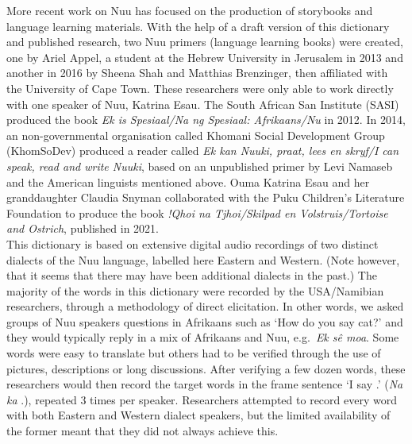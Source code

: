 More recent work on N\textipa{\textvertline}uu has focused on the
production of storybooks and language learning materials. With the
help of a draft version of this dictionary and published research, two
N\textipa{\textvertline}uu primers (language learning books) were
created, one by Ariel Appel, a student at the Hebrew University in
Jerusalem in 2013 and another in 2016 by Sheena Shah and Matthias
Brenzinger, then affiliated with the University of Cape Town. These
researchers were only able to work directly with one speaker of
N\textipa{\textvertline}uu, Katrina Esau. The South African San
Institute (SASI) produced the book \emph{Ek is Spesiaal/Na ng
Spesiaal: Afrikaans/N\textipa{\textvertline}u} in 2012. In 2014, an
non-governmental organisation called
\textipa{\textdoublebarpipe}Khomani Social Development Group
(KhomSoDev) produced a reader called \emph{Ek kan
N\textipa{\textvertline}uuki, praat, lees en skryf/I can speak, read
and write N\textipa{\textvertline}uuki}, based on an unpublished
primer by Levi Namaseb and the American linguists mentioned above.
Ouma Katrina Esau and her granddaughter Claudia Snyman collaborated
with the Puku Children's Literature Foundation to produce the book
\emph{!Qhoi n\textipa{\textvertline}a Tjhoi/Skilpad en
Volstruis/Tortoise and Ostrich}, published in 2021.\\

This dictionary is based on extensive digital audio recordings of two
distinct dialects of the N\textipa{\textvertline}uu language, labelled
here Eastern and Western. (Note however, that it seems that there may
have been additional dialects in the past.) The majority of the words
in this dictionary were recorded by the USA/Namibian researchers,
through a methodology of direct elicitation. In other words, we asked
groups of N\textipa{\textvertline}uu speakers questions in Afrikaans
such as `How do you say cat?' and they would typically reply in a mix
of Afrikaans and N\textipa{\textvertline}uu, e.g.\ \emph{Ek s\^{e}
moa}. Some words were easy to translate but others had to
be verified through the use of pictures, descriptions or long
discussions. After verifying a few dozen words, these researchers
would then record the target words in the frame sentence `I say
\underline{\hspace{1cm}}.' (\emph{Na ka} \underline{\hspace{1cm}}.),
repeated 3 times per speaker. Researchers attempted to record every
word with both Eastern and Western dialect speakers, but the limited
availability of the former meant that they did not always achieve
this.\\

